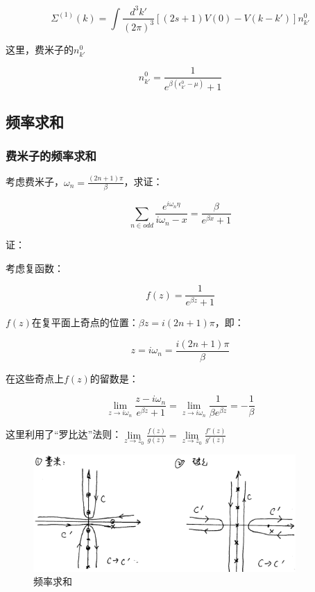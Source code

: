\begin{equation}
\Sigma^{(1)}(k) = \int \frac{d^3 k'}{(2 \pi)^3} \left[ (2s+1)V(0) - V(k - k') \right] n^0_{k'}
\end{equation}

这里，费米子的$n^0_{k'}$

\begin{equation}
n^0_{k'} = \frac{1}{ e^{ \beta ( \epsilon^0_{k'} - \mu  ) } + 1 }
\end{equation}

\subsection{频率求和}

\subsubsection{费米子的频率求和}

考虑费米子，$\omega_n = \frac{ (2n+1) \pi}{\beta}$，求证：

\begin{equation}
\sum\limits_{n \in odd } \frac{e^{i \omega_n \eta}}{i \omega_n - x } =\frac{ \beta}{ e^{\beta x} + 1 }
\end{equation}

证：

考虑复函数：

\begin{equation}
f(z) = \frac{1}{e^{\beta z} + 1}
\end{equation}

$f(z)$在复平面上奇点的位置：$\beta z = i (2n +1) \pi$，即：

\begin{equation*}
z = i \omega_n = \frac{i (2n +1)\pi }{\beta}
\end{equation*}

在这些奇点上$f(z)$的留数是：

\begin{equation*}
\lim\limits_{z \to i\omega_n  } \frac{z - i \omega_n}{ e^{\beta z} + 1 } =  \lim\limits_{z \to i\omega_n  } \frac{1}{ \beta e^{\beta z}  } = - \frac{1}{\beta}
\end{equation*}

这里利用了“罗比达”法则：$\lim\limits_{z \to z_0} \frac{f(z)}{g(z)} = \lim\limits_{z \to z_0} \frac{ f'(z) }{ g'(z) } $

\begin{figure}[htbp]
\begin{center}
\includegraphics[width=10cm]{Finite/frequencysummation.png}
\caption{频率求和}
\end{center}
\end{figure}

